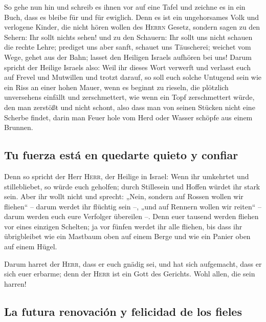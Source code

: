  So gehe nun hin und schreib es ihnen vor auf eine Tafel
und zeichne es in ein Buch, dass es bleibe für und für ewiglich.
 Denn es ist ein ungehorsames Volk und verlogene Kinder,
die nicht hören wollen des \textsc{Herrn} Gesetz, 
sondern sagen zu den Sehern: Ihr sollt nichts sehen! und zu den
Schauern: Ihr sollt uns nicht schauen die rechte Lehre; prediget uns
aber sanft, schauet uns Täuscherei;  weichet vom Wege,
gehet aus der Bahn; lasset den Heiligen Israels aufhören bei uns!
 Darum spricht der Heilige Israels also: Weil ihr dieses
Wort verwerft und verlasst euch auf Frevel und Mutwillen und trotzt
darauf,  so soll euch solche Untugend sein wie ein Riss
an einer hohen Mauer, wenn es beginnt zu rieseln, die plötzlich
unversehens einfällt und zerschmettert,  wie wenn ein
Topf zerschmettert würde, den man zerstößt und nicht schont, also dass
man von seinen Stücken nicht eine Scherbe findet, darin man Feuer hole
vom Herd oder Wasser schöpfe aus einem Brunnen.

\hypertarget{tu-fuerza-estuxe1-en-quedarte-quieto-y-confiar}{%
\subsection{Tu fuerza está en quedarte quieto y
confiar}\label{tu-fuerza-estuxe1-en-quedarte-quieto-y-confiar}}

 Denn so spricht der Herr \textsc{Herr}, der Heilige in
Israel: Wenn ihr umkehrtet und stillebliebet, so würde euch geholfen;
durch Stillesein und Hoffen würdet ihr stark sein. Aber ihr wollt nicht
 und sprecht: „Nein, sondern auf Rossen wollen wir
fliehen`` -- darum werdet ihr flüchtig sein --, „und auf Rennern wollen
wir reiten`` -- darum werden euch eure Verfolger übereilen --.
 Denn euer tausend werden fliehen vor eines einzigen
Schelten; ja vor fünfen werdet ihr alle fliehen, bis dass ihr
übrigbleibet wie ein Mastbaum oben auf einem Berge und wie ein Panier
oben auf einem Hügel.

 Darum harret der \textsc{Herr}, dass er euch gnädig sei,
und hat sich aufgemacht, dass er sich euer erbarme; denn der
\textsc{Herr} ist ein Gott des Gerichts. Wohl allen, die sein harren!

\hypertarget{la-futura-renovaciuxf3n-y-felicidad-de-los-fieles}{%
\subsection{La futura renovación y felicidad de los
fieles}\label{la-futura-renovaciuxf3n-y-felicidad-de-los-fieles}}

